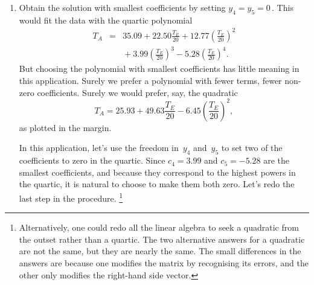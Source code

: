 \begin{example}
\begin{solution}
\begin{enumerate}
\item Obtain the solution with smallest coefficients by setting \(y_4=y_5=0\)\,.
This would fit the data with the quartic polynomial
\begin{eqnarray*}
T_A&=&35.09+22.50\frac{T_E}{20} 
+12.77\left(\frac{T_E}{20}\right)^2
\\&&{}
+3.99\left(\frac{T_E}{20}\right)^3
-5.28\left(\frac{T_E}{20}\right)^4.
\end{eqnarray*}%
But choosing the polynomial with smallest coefficients has little meaning in this application.
Surely we prefer a polynomial with fewer terms, fewer non-zero coefficients.
Surely we would prefer, say, the quadratic
\begin{equation*}
T_A=25.93+49.63\frac{T_E}{20} 
-6.45\left(\frac{T_E}{20}\right)^2,
\end{equation*}
as plotted in the margin.

In this application, let's use the freedom in~\(y_4\) and~\(y_5\) to set two of the coefficients to zero in the quartic.
Since \(c_4=3.99\) and \(c_5=-5.28\) are the smallest coefficients, and because they correspond to the highest powers in the quartic, it is natural to choose to make them both zero.
Let's redo the last step in the procedure.
\footnote{Alternatively, one could redo all the linear algebra to seek a quadratic from the outset rather than a quartic.  
The two alternative answers for a quadratic are not the same, but they are nearly the same.  
The small differences in the answers are because one modifies the matrix by recognising its errors, and the other only modifies the right-hand side vector.}


\end{enumerate}
\end{solution}
\end{example}
